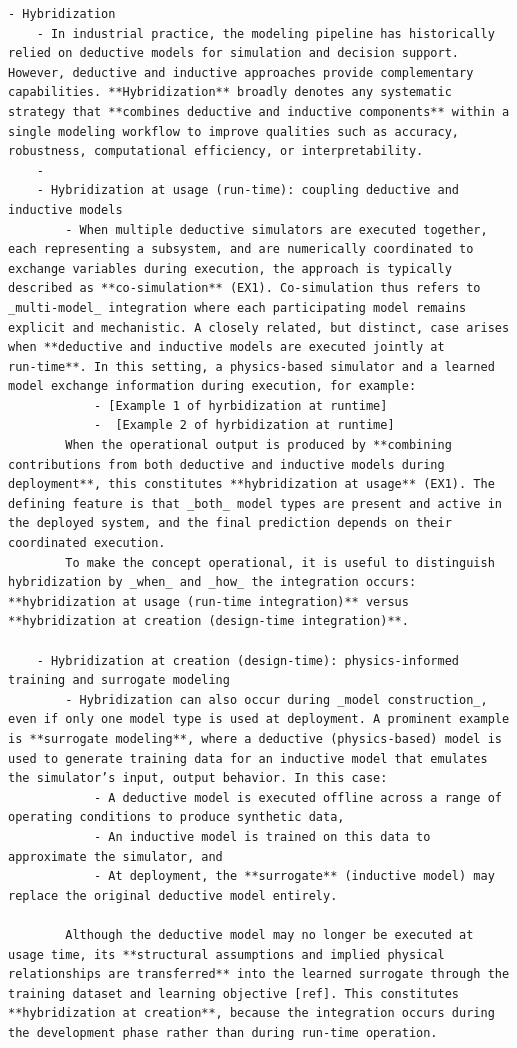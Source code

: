 \documentclass[
]{article}
\begin{document}
\begin{verbatim}
- Hybridization
    - In industrial practice, the modeling pipeline has historically relied on deductive models for simulation and decision support. However, deductive and inductive approaches provide complementary capabilities. **Hybridization** broadly denotes any systematic strategy that **combines deductive and inductive components** within a single modeling workflow to improve qualities such as accuracy, robustness, computational efficiency, or interpretability.
    - 
    - Hybridization at usage (run‑time): coupling deductive and inductive models
        - When multiple deductive simulators are executed together, each representing a subsystem, and are numerically coordinated to exchange variables during execution, the approach is typically described as **co‑simulation** (EX1). Co‑simulation thus refers to _multi‑model_ integration where each participating model remains explicit and mechanistic. A closely related, but distinct, case arises when **deductive and inductive models are executed jointly at run‑time**. In this setting, a physics‑based simulator and a learned model exchange information during execution, for example:
            - [Example 1 of hyrbidization at runtime]
            -  [Example 2 of hyrbidization at runtime]
        When the operational output is produced by **combining contributions from both deductive and inductive models during deployment**, this constitutes **hybridization at usage** (EX1). The defining feature is that _both_ model types are present and active in the deployed system, and the final prediction depends on their coordinated execution.
        To make the concept operational, it is useful to distinguish hybridization by _when_ and _how_ the integration occurs: **hybridization at usage (run‑time integration)** versus **hybridization at creation (design‑time integration)**.

    - Hybridization at creation (design‑time): physics‑informed training and surrogate modeling
        - Hybridization can also occur during _model construction_, even if only one model type is used at deployment. A prominent example is **surrogate modeling**, where a deductive (physics‑based) model is used to generate training data for an inductive model that emulates the simulator’s input, output behavior. In this case:
            - A deductive model is executed offline across a range of operating conditions to produce synthetic data,
            - An inductive model is trained on this data to approximate the simulator, and
            - At deployment, the **surrogate** (inductive model) may replace the original deductive model entirely.
        
        Although the deductive model may no longer be executed at usage time, its **structural assumptions and implied physical relationships are transferred** into the learned surrogate through the training dataset and learning objective [ref]. This constitutes **hybridization at creation**, because the integration occurs during the development phase rather than during run‑time operation.
    
    
\end{verbatim}
\end{document}
